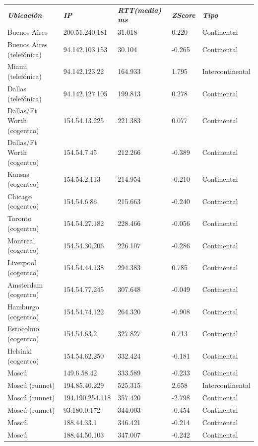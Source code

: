 \begin{tabular}{lllll}

	\textit{\textbf{Ubicaci\'on}}	&	\textit{\textbf{IP}}	&	\textit{\textbf{RTT(media) ms}}	&	\textit{\textbf{ZScore}}	&	\textit{\textbf{Tipo}}	\\
	Buenos Aires			&	200.51.240.181	&	31.018	&	0.220	&	Continental	\\
	Buenos Aires (telef\'onica)	&	94.142.103.153	&	30.104	&	-0.265	&	Continental	\\
	Miami (telef\'onica)		&	94.142.123.22	&	164.933	&	1.795	&	Intercontinental	\\
	Dallas (telef\'onica)		&	94.142.127.105	&	199.813	&	0.278	&	Continental	\\
	Dallas/Ft Worth (cogentco)	&	154.54.13.225	&	221.383	&	0.077	&	Continental	\\
	Dallas/Ft Worth (cogentco)	&	154.54.7.45	&	212.266	&	-0.389	&	Continental	\\
	Kansas (cogentco)		&	154.54.2.113	&	214.954	&	-0.210	&	Continental	\\
	Chicago (cogentco)		&	154.54.6.86	&	215.663	&	-0.240	&	Continental	\\
	Toronto (cogentco)		&	154.54.27.182	&	228.466	&	-0.056	&	Continental	\\
	Montreal (cogentco)		&	154.54.30.206	&	226.107	&	-0.286	&	Continental	\\
	Liverpool (cogentco)		&	154.54.44.138	&	294.383	&	0.785	&	Continental	\\
	Amsterdam (cogentco)		&	154.54.77.245	&	307.648	&	-0.049	&	Continental	\\
	Hamburgo (cogentco)		&	154.54.74.122	&	264.320	&	-0.908	&	Continental	\\
	Estocolmo (cogentco)		&	154.54.63.2	&	327.827	&	0.713	&	Continental	\\
	Helsinki (cogentco)		&	154.54.62.250	&	332.424	&	-0.181	&	Continental	\\
	Mosc\'u				&	149.6.58.42	&	333.589	&	-0.233	&	Continental	\\
	Mosc\'u (runnet)		&	194.85.40.229	&	525.315	&	2.658	&	Intercontinental	\\
	Mosc\'u (runnet)		&	194.190.254.118	&	357.420	&	-2.798	&	Continental	\\
	Mosc\'u (runnet)		&	93.180.0.172	&	344.003	&	-0.454	&	Continental	\\
	Mosc\'u				&	188.44.33.1	&	346.421	&	-0.214	&	Continental	\\
	Mosc\'u				&	188.44.50.103	&	347.007	&	-0.242	&	Continental	\\

\end{tabular}

